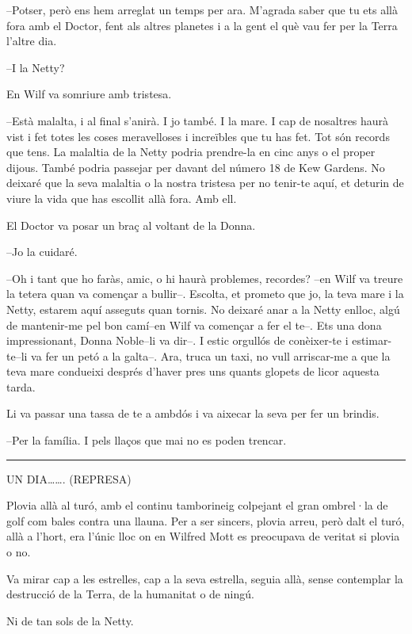 --Potser, però ens hem arreglat un temps per ara. M'agrada saber que tu
ets allà fora amb el Doctor, fent als altres planetes i a la gent el què
vau fer per la Terra l'altre dia.

--I la Netty?

En Wilf va somriure amb tristesa.

--Està malalta, i al final s'anirà. I jo també. I la mare. I cap de
nosaltres haurà vist i fet totes les coses meravelloses i increïbles que
tu has fet. Tot són records que tens. La malaltia de la Netty podria
prendre-la en cinc anys o el proper dijous. També podria passejar per
davant del número 18 de Kew Gardens. No deixaré que la seva malaltia o
la nostra tristesa per no tenir-te aquí, et deturin de viure la vida que
has escollit allà fora. Amb ell.

El Doctor va posar un braç al voltant de la Donna.

--Jo la cuidaré.

--Oh i tant que ho faràs, amic, o hi haurà problemes, recordes? --en
Wilf va treure la tetera quan va començar a bullir--. Escolta, et
prometo que jo, la teva mare i la Netty, estarem aquí asseguts quan
tornis. No deixaré anar a la Netty enlloc, algú de mantenir-me pel bon
camí--en Wilf va començar a fer el te--. Ets una dona impressionant,
Donna Noble--li va dir--. I estic orgullós de conèixer-te i
estimar-te--li va fer un petó a la galta--. Ara, truca un taxi, no vull
arriscar-me a que la teva mare condueixi després d'haver pres uns quants
glopets de licor aquesta tarda.

Li va passar una tassa de te a ambdós i va aixecar la seva per fer un
brindis.

--Per la família. I pels llaços que mai no es poden trencar.

\begin{center}\rule{3in}{0.4pt}\end{center}

UN DIA\ldots{}\ldots{}. (REPRESA)

Plovia allà al turó, amb el continu tamborineig colpejant el gran
ombrel·la de golf com bales contra una llauna. Per a ser sincers, plovia
arreu, però dalt el turó, allà a l'hort, era l'únic lloc on en Wilfred
Mott es preocupava de veritat si plovia o no.

Va mirar cap a les estrelles, cap a la seva estrella, seguia allà, sense
contemplar la destrucció de la Terra, de la humanitat o de ningú.

Ni de tan sols de la Netty.

